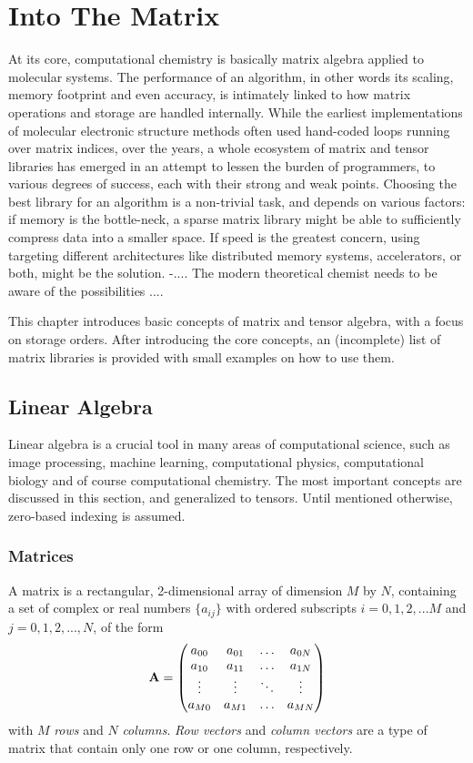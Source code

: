 \chapter{Into The Matrix}

At its core, computational chemistry is basically matrix algebra applied to molecular systems. The performance of an algorithm, in other words its scaling, memory footprint and even accuracy, is intimately linked to how matrix operations and storage are handled internally. While the earliest implementations of molecular electronic structure methods often used hand-coded loops running over matrix indices, over the years, a whole ecosystem of matrix and tensor libraries has emerged in an attempt to lessen the burden of programmers, to various degrees of success, each with their strong and weak points. Choosing the best library for an algorithm is a non-trivial task, and depends on various factors: if memory is the bottle-neck, a sparse matrix library might be able to sufficiently compress data into a smaller space. If speed is the greatest concern, using targeting different architectures like distributed memory systems, accelerators, or both, might be the solution. -.... The modern theoretical chemist needs to be aware of the possibilities ....

This chapter introduces basic concepts of matrix and tensor algebra, with a focus on storage orders. After introducing the core concepts, an (incomplete) list of matrix libraries is provided with small examples on how to use them. 

\section{Linear Algebra}

Linear algebra is a crucial tool in many areas of computational science, such as image processing, machine learning, computational physics, computational biology and of course computational chemistry. The most important concepts are discussed in this section, and generalized to tensors. Until mentioned otherwise, zero-based indexing is assumed. 

\subsection{Matrices}

A matrix is a rectangular, 2-dimensional array of dimension $M$ by $N$, containing a set of complex or real numbers $\{a_{ij}\}$ with ordered subscripts $i = 0,1,2,...M$ and $j = 0,1,2,...,N$, of the form
\begin{equation}
\mathbf{A} = \begin{pmatrix}
a_{00} & a_{01} & \ldots & a_{0N} \\
a_{10} & a_{11} & \ldots & a_{1N} \\
\vdots & \vdots & \ddots & \vdots \\
a_{M0} & a_{M1} & \ldots & a_{MN}
\end{pmatrix}
\end{equation}
\noindent with $M$ \emph{rows} and $N$ \emph{columns}. \emph{Row vectors} and \emph{column vectors} are a type of matrix that contain only one row or one column, respectively. 

